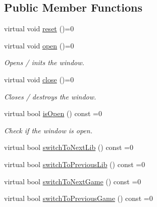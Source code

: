 \subsection*{Public Member Functions}
\begin{DoxyCompactItemize}
\item 
virtual void \hyperlink{class_i_display_module_ad78d193932e1fd55d4e956fc8e5cde88}{reset} ()=0
\item 
\mbox{\label{class_i_display_module_a54616e1c980d64bf92e0a2322adba074}} 
virtual void \hyperlink{class_i_display_module_a54616e1c980d64bf92e0a2322adba074}{open} ()=0
\begin{DoxyCompactList}\small\item\em Opens / inits the window. \end{DoxyCompactList}\item 
\mbox{\label{class_i_display_module_a32df0a3ed2c9b27eebbbb844bffbbba2}} 
virtual void \hyperlink{class_i_display_module_a32df0a3ed2c9b27eebbbb844bffbbba2}{close} ()=0
\begin{DoxyCompactList}\small\item\em Closes / destroys the window. \end{DoxyCompactList}\item 
\mbox{\label{class_i_display_module_a939107266bbb08eb1d84f37914dcada4}} 
virtual bool \hyperlink{class_i_display_module_a939107266bbb08eb1d84f37914dcada4}{is\+Open} () const =0
\begin{DoxyCompactList}\small\item\em Check if the window is open. \end{DoxyCompactList}\item 
virtual bool \hyperlink{class_i_display_module_ab5fb374a14b78037eab463b2cb1971dd}{switch\+To\+Next\+Lib} () const =0
\item 
virtual bool \hyperlink{class_i_display_module_a1e23d65af2b94dda013055af15100ebe}{switch\+To\+Previous\+Lib} () const =0
\item 
virtual bool \hyperlink{class_i_display_module_a7b6a45861835b29679c6c5799b63c4f1}{switch\+To\+Next\+Game} () const =0
\item 
virtual bool \hyperlink{class_i_display_module_a09e20d4bbf16ac3aff8f62c54b4814e3}{switch\+To\+Previous\+Game} () const =0
\item 

\end{DoxyCompactItemize}

